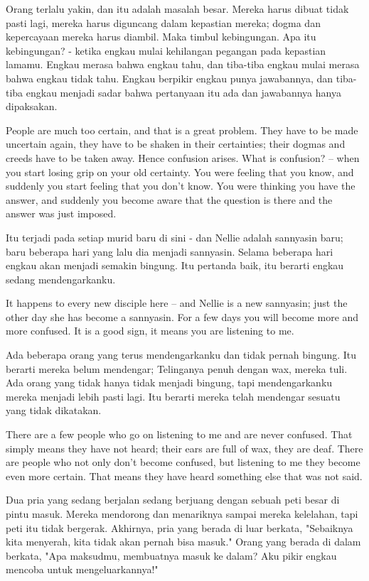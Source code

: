 \bahasa
Orang terlalu yakin, dan itu adalah masalah besar. Mereka harus dibuat tidak pasti lagi, mereka harus diguncang dalam kepastian mereka; dogma dan kepercayaan mereka harus diambil. Maka timbul kebingungan. Apa itu kebingungan? - ketika engkau mulai kehilangan pegangan pada kepastian lamamu. Engkau merasa bahwa engkau tahu, dan tiba-tiba engkau mulai merasa bahwa engkau tidak tahu. Engkau berpikir engkau punya jawabannya, dan tiba-tiba engkau menjadi sadar bahwa pertanyaan itu ada dan jawabannya hanya dipaksakan.

\english
People are much too certain, and that is a great problem. They have to be made uncertain again, they have to be shaken in their certainties; their dogmas and creeds have to be taken away. Hence confusion arises. What is confusion? -- when you start losing grip on your old certainty. You were feeling that you know, and suddenly you start feeling that you don't know. You were thinking you have the answer, and suddenly you become aware that the question is there and the answer was just imposed.

\bahasa
Itu terjadi pada setiap murid baru di sini - dan Nellie adalah sannyasin baru; baru beberapa hari yang lalu dia menjadi sannyasin. Selama beberapa hari engkau akan menjadi semakin bingung. Itu pertanda baik, itu berarti engkau sedang mendengarkanku.

\english
It happens to every new disciple here -- and Nellie is a new sannyasin; just the other day she has become a sannyasin. For a few days you will become more and more confused. It is a good sign, it means you are listening to me.

\bahasa
Ada beberapa orang yang terus mendengarkanku dan tidak pernah bingung. Itu berarti mereka belum mendengar; Telinganya penuh dengan wax, mereka tuli. Ada orang yang tidak hanya tidak menjadi bingung, tapi mendengarkanku mereka menjadi lebih pasti lagi. Itu berarti mereka telah mendengar sesuatu yang tidak dikatakan.

\english
There are a few people who go on listening to me and are never confused. That simply means they have not heard; their ears are full of wax, they are deaf. There are people who not only don't become confused, but listening to me they become even more certain. That means they have heard something else that was not said.

\bahasa
Dua pria yang sedang berjalan sedang berjuang dengan sebuah peti besar di pintu masuk. Mereka mendorong dan menariknya sampai mereka kelelahan, tapi peti itu tidak bergerak. Akhirnya, pria yang berada di luar berkata, "Sebaiknya kita menyerah, kita tidak akan pernah bisa masuk." Orang yang berada di dalam berkata, "Apa maksudmu, membuatnya masuk ke dalam? Aku pikir engkau mencoba untuk mengeluarkannya!"


